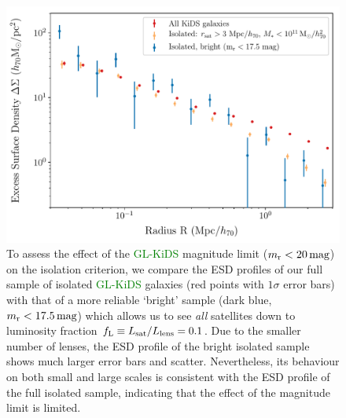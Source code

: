 \documentclass[usenatbib]{mnras}
\newcommand{\magn}{\, {\rm mag} }
\newcommand{\un}[1]{_{\rm #1}}
\begin{document}
\begin{figure}
	\includegraphics[width=1.0\columnwidth]{Figures/ESD_KiDS_isotest.pdf}
	\caption{To assess the effect of the \textcolor{Green}{GL-KiDS} magnitude limit ($m\un{r}<20 \magn$) on the isolation criterion, we compare the ESD profiles of our full sample of isolated \textcolor{Green}{GL-KiDS} galaxies (red points with $1\sigma$ error bars) with that of a more reliable `bright' sample (dark blue, $m\un{r}<17.5 \magn$) which allows us to see \emph{all} satellites down to luminosity fraction $f\un{L} \equiv L\un{sat}/L\un{lens}=0.1$. Due to the smaller number of lenses, the ESD profile of the bright isolated sample shows much larger error bars and scatter. Nevertheless, its behaviour on both small and large scales is consistent with the ESD profile of the full isolated sample, indicating that the effect of the magnitude limit is limited.}
	\label{fig:isolation_test_ESD}
\end{figure}
\end{document}
